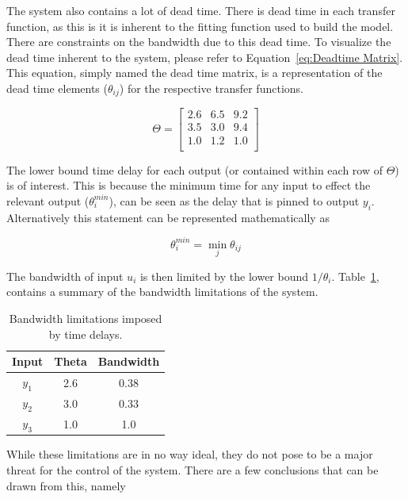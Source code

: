 The system also contains a lot of dead time. There is dead time in each transfer function, as this is it is inherent to the fitting function used to build the model. There are constraints on the bandwidth due to this dead time. To visualize the dead time inherent to the system, please refer to Equation~\ref{eq:Deadtime Matrix}. This equation, simply named the dead time matrix, is a representation of the dead time elements ($\theta_{ij}$) for the respective transfer functions.

\begin{equation}
	\label{eq:Deadtime Matrix}
	\Theta = \begin{bmatrix}
	 2.6 & 6.5 & 9.2 \\
	 3.5 & 3.0 & 9.4 \\
	 1.0 & 1.2 & 1.0\\
	\end{bmatrix}
\end{equation} 

The lower bound time delay for each output (or contained within each row of $\Theta$) is of interest. This is because the minimum time for any input to effect the relevant output ($\theta_i^{min}$), can be seen as the delay that is pinned to output $y_i$. Alternatively this statement can be represented mathematically as 

\begin{equation}
	\theta_i^{min} = \min_j \theta_{ij}
\end{equation}

The bandwidth of input $u_i$ is then limited by the lower bound $1/\theta_i$. Table~\ref{tab:Bandwidths}, contains a summary of the bandwidth limitations of the system.

\begin{table}[H]
	\centering
	\begin{tabular}{ccc}
		\hline
		\textbf{Input} & \textbf{Theta} & \textbf{Bandwidth} \\
		\hline
		$y_1$             & 2.6            & 0.38               \\
		$y_2$             & 3.0              & 0.33               \\
		$y_3$             & 1.0              & 1.0                 \\\hline
	\end{tabular}
	\caption{Bandwidth limitations imposed by time delays.}
	\label{tab:Bandwidths}
\end{table}

While these limitations are in no way ideal, they do not pose to be a major threat for the control of the system. There are a few conclusions that can be drawn from this, namely

